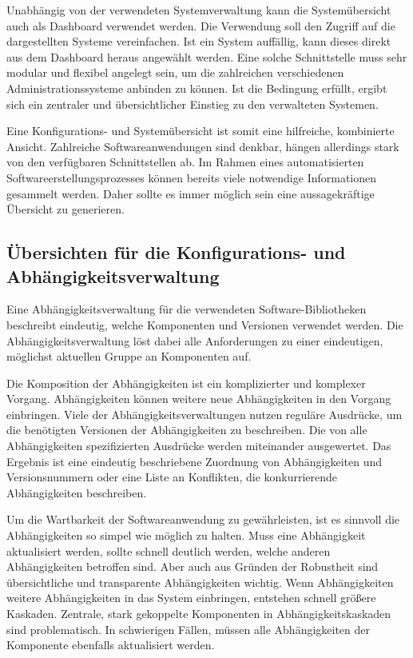 Unabhängig von der verwendeten Systemverwaltung kann die Systemübersicht auch als Dashboard verwendet werden. Die Verwendung soll den Zugriff auf die dargestellten Systeme vereinfachen. Ist ein System auffällig, kann dieses direkt aus dem Dashboard heraus angewählt werden. Eine solche Schnittstelle muss sehr modular und flexibel angelegt sein, um die zahlreichen verschiedenen Administrationssysteme anbinden zu können. Ist die Bedingung erfüllt, ergibt sich ein zentraler und übersichtlicher Einstieg zu den verwalteten Systemen.

Eine Konfigurations- und Systemübersicht ist somit eine hilfreiche, kombinierte Ansicht. Zahlreiche Softwareanwendungen sind denkbar, hängen allerdings stark von den verfügbaren Schnittstellen ab. Im Rahmen eines automatisierten Softwareerstellungsprozesses können bereits viele notwendige Informationen gesammelt werden. Daher sollte es immer möglich sein eine aussagekräftige Übersicht zu generieren.

\subsection{Übersichten für die Konfigurations- und Abhängigkeitsverwaltung}

Eine Abhängigkeitsverwaltung für die verwendeten Software-Bibliotheken beschreibt eindeutig, welche Komponenten und Versionen verwendet werden. Die Abhängigkeitsverwaltung löst dabei alle Anforderungen zu einer eindeutigen, möglichst aktuellen Gruppe an Komponenten auf. 

Die Komposition der Abhängigkeiten ist ein komplizierter und komplexer Vorgang. Abhängigkeiten können weitere neue Abhängigkeiten in den Vorgang einbringen. Viele der Abhängigkeitsverwaltungen nutzen reguläre Ausdrücke, um die benötigten Versionen der Abhängigkeiten zu beschreiben. Die von alle Abhängigkeiten spezifizierten Ausdrücke werden miteinander ausgewertet. Das Ergebnis ist eine eindeutig beschriebene Zuordnung von Abhängigkeiten und Versionsnummern oder eine Liste an Konflikten, die konkurrierende Abhängigkeiten beschreiben.

Um die Wartbarkeit der Softwareanwendung zu gewährleisten, ist es sinnvoll die Abhängigkeiten so simpel wie möglich zu halten. Muss eine Abhängigkeit aktualisiert werden, sollte schnell deutlich werden, welche anderen Abhängigkeiten betroffen sind.
Aber auch aus Gründen der Robustheit sind übersichtliche und transparente Abhängigkeiten wichtig. Wenn Abhängigkeiten weitere Abhängigkeiten in das System einbringen, entstehen schnell größere Kaskaden. Zentrale, stark gekoppelte Komponenten in Abhängigkeitskaskaden sind problematisch. In schwierigen Fällen, müssen alle Abhängigkeiten der Komponente ebenfalls aktualisiert werden.

